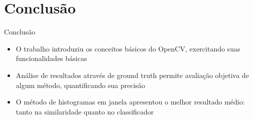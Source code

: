 \documentclass[
    style=paintings,
    paper=screen,
    blackslide,
    nopagebreaks,
    fleqn
]{powerdot}
\begin{document}
\section[slide=false]{Conclusão}
\begin{slide}{Conclusão}
\begin{itemize}[type=1]
\item <1-> O trabalho introduziu os conceitos básicos do OpenCV, exercitando suas funcionalidades básicas
\item <2-> Análise de resultados através de ground truth permite avaliação objetiva de algum método, quantificando sua precisão
\item <3-> O método de histogramas em janela apresentou o melhor resultado médio: tanto na similaridade quanto no classificador
\end{itemize}
\end{slide}

%
%
\end{document}
